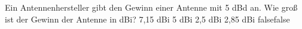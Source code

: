     {Ein Antennenhersteller gibt den Gewinn einer Antenne mit 5 dBd an. Wie groß ist der Gewinn der Antenne in dBi?}
    {7,15 dBi}
    {5 dBi}
    {2,5 dBi}
    {2,85 dBi}
    {false}{false}